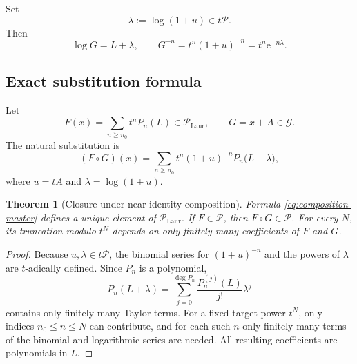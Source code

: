 \documentclass[11pt]{article}
\theoremstyle{pltheorem}
\newtheorem{theorem}{Theorem}[section]
\newcommand{\PL}{\mathscr P}
\newcommand{\PLL}{\mathscr P_{\mathrm{Laur}}}
\newcommand{\Gnear}{\mathcal G}
\newcommand{\e}{\mathrm e}
\newcommand{\compose}{\mathbin{\circ}}
\begin{document}
Set
\begin{equation}\label{eq:lambda-def}
 \lambda:=\log(1+u)\in t\PL.
\end{equation}
Then
\begin{equation}\label{eq:logG-and-inverseG}
 \log G=L+\lambda,
 \qquad
 G^{-n}=t^n(1+u)^{-n}=t^n\e^{-n\lambda}.
\end{equation}

\subsection{Exact substitution formula}

Let
\begin{equation}\label{eq:F-general-composition}
 F(x)=\sum_{n\ge n_0}t^nP_n(L)\in\PLL,
 \qquad
 G=x+A\in\Gnear.
\end{equation}
The natural substitution is
\begin{equation}\label{eq:composition-master}
 (F\compose G)(x)
 =\sum_{n\ge n_0}t^n(1+u)^{-n}
 P_n\bigl(L+\lambda\bigr),
\end{equation}
where \(u=tA\) and \(\lambda=\log(1+u)\).

\begin{theorem}[Closure under near-identity composition]\label{thm:composition-closure}
Formula \cref{eq:composition-master} defines a unique element of \(\PLL\).  If \(F\in\PL\), then \(F\compose G\in\PL\).  For every \(N\), its truncation modulo \(t^N\) depends on only finitely many coefficients of \(F\) and \(G\).
\end{theorem}

\begin{proof}
Because \(u,\lambda\in t\PL\), the binomial series for \((1+u)^{-n}\) and the powers of \(\lambda\) are \(t\)-adically defined.  Since \(P_n\) is a polynomial,
\begin{equation}\label{eq:polynomial-shift}
 P_n(L+\lambda)
 =\sum_{j=0}^{\deg P_n}\frac{P_n^{(j)}(L)}{j!}\lambda^j
\end{equation}
contains only finitely many Taylor terms.  For a fixed target power \(t^N\), only indices \(n_0\le n\le N\) can contribute, and for each such \(n\) only finitely many terms of the binomial and logarithmic series are needed.  All resulting coefficients are polynomials in \(L\).
\end{proof}
\end{document}
